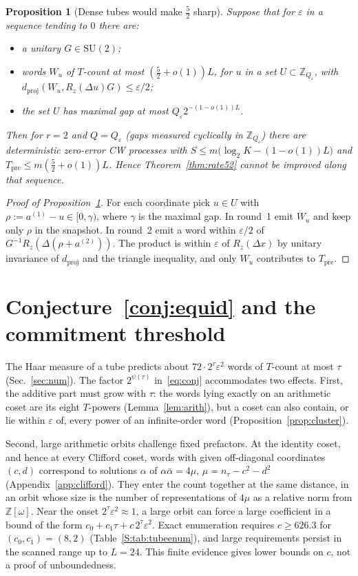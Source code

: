 \documentclass[aps,prx,twocolumn,superscriptaddress,nofootinbib,longbibliography]{revtex4-2}
\theoremstyle{plain}
\newtheorem{proposition}{Proposition}
\theoremstyle{definition}
\theoremstyle{remark}
\newcommand{\dproj}{d_{\mathrm{proj}}}
\newcommand{\Tpre}{T_{\mathrm{pre}}}
\newcommand{\Z}{\mathbb{Z}}
\newcommand{\SU}{\mathrm{SU}(2)}
\begin{document}
\begin{proposition}[Dense tubes would make $\tfrac52$ sharp]\label{prop:dense}
Suppose that for $\varepsilon$ in a sequence tending to $0$ there are:
\begin{itemize}\setlength\itemsep{0pt}
\item a unitary $G\in\SU$;
\item words $W_u$ of $T$-count at most $(\tfrac52+o(1))L$, for $u$ in a set $U\subset\Z_{Q_\varepsilon}$, with $\dproj(W_u,R_z(\Delta u)G)\le\varepsilon/2$;
\item the set $U$ has maximal gap at most $Q_\varepsilon2^{-(1-o(1))L}$.
\end{itemize}
Then for $r=2$ and $Q=Q_\varepsilon$ (gaps measured cyclically in $\Z_{Q_\varepsilon}$) there are deterministic zero-error CW processes with $S\le m\big(\log_2K-(1-o(1))L\big)$ and $\Tpre\le m(\tfrac52+o(1))L$. Hence Theorem~\ref{thm:rate52} cannot be improved along that sequence.
\end{proposition}
\begin{proof}[Proof of Proposition~\ref{prop:dense}]
For each coordinate pick $u\in U$ with $\rho:=a^{(1)}-u\in[0,\gamma)$, where $\gamma$ is the maximal gap. In round~1 emit $W_u$ and keep only $\rho$ in the snapshot. In round~2 emit a word within $\varepsilon/2$ of $G^{-1}R_z(\Delta(\rho+a^{(2)}))$. The product is within $\varepsilon$ of $R_z(\Delta x)$ by unitary invariance of $\dproj$ and the triangle inequality, and only $W_u$ contributes to $\Tpre$.
\end{proof}

\section{Conjecture~\ref{conj:equid} and the commitment threshold}\label{app:conj}

The Haar measure of a tube predicts about $72\cdot2^\tau\varepsilon^2$ words of $T$-count at most $\tau$ (Sec.~\ref{sec:num}). The factor $2^{\psi(\tau)}$ in~\eqref{eq:conj} accommodates two effects. First, the additive part must grow with $\tau$: the words lying exactly on an arithmetic coset are its eight $T$-powers (Lemma~\ref{lem:arith}), but a coset can also contain, or lie within $\varepsilon$ of, every power of an infinite-order word (Proposition~\ref{prop:cluster}). 

Second, large arithmetic orbits challenge fixed prefactors. At the identity coset, and hence at every Clifford coset, words with given off-diagonal coordinates $(c,d)$ correspond to solutions $\alpha$ of $\alpha\bar\alpha=4\mu$, $\mu=n_\tau-c^2-d^2$ (Appendix~\ref{app:clifford}). They enter the count together at the same distance, in an orbit whose size is the number of representations of $4\mu$ as a relative norm from $\Z[\omega]$. Near the onset $2^\tau\varepsilon^2\approx1$, a large orbit can force a large coefficient in a bound of the form $c_0+c_1\tau+c\,2^\tau\varepsilon^2$. Exact enumeration requires $c\ge626.3$ for $(c_0,c_1)=(8,2)$ (Table~\ref{S:tab:tubeenum}), and large requirements persist in the scanned range up to $L=24$. This finite evidence gives lower bounds on $c$, not a proof of unboundedness.
\end{document}
